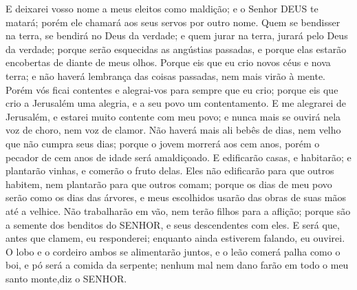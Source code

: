 {
  E deixarei vosso nome a meus eleitos como maldição; e o Senhor DEUS te matará; porém ele chamará aos seus servos por outro nome.
  Quem se bendisser na terra, se bendirá no Deus da verdade; e quem jurar na terra, jurará pelo Deus da verdade; porque serão esquecidas as angústias passadas, e porque elas estarão encobertas de diante de meus olhos.
  Porque eis que eu crio novos céus e nova terra; e não haverá{} lembrança das coisas passadas, nem mais virão à mente.
  Porém vós ficai contentes e alegrai-vos para sempre
{} que eu crio; porque eis que crio a Jerusalém uma alegria, e a seu povo um contentamento.
  E me alegrarei de Jerusalém, e estarei muito contente com meu povo; e nunca mais se ouvirá nela voz de choro, nem voz de clamor.
  Não haverá mais ali bebês de
{} dias, nem velho que não cumpra seus dias; porque o jovem morrerá aos cem anos, porém o pecador de cem anos de idade será amaldiçoado.
  E edificarão casas, e
{} habitarão; e plantarão vinhas, e comerão o fruto delas.
  Eles não edificarão para que outros habitem, nem plantarão para que outros comam; porque os dias de meu povo serão como os dias das árvores,
 e meus escolhidos usarão das obras de suas mãos até a velhice.
  Não trabalharão em vão, nem terão filhos para a aflição; porque são a semente dos benditos do SENHOR, e seus descendentes com eles.
  E será que, antes que clamem, eu responderei; enquanto ainda estiverem falando, eu ouvirei.
  O lobo e o cordeiro ambos se alimentarão juntos, e o leão comerá palha como o boi, e pó será a comida da serpente; nenhum mal nem dano farão em todo o meu santo monte,diz o SENHOR.
\par }

